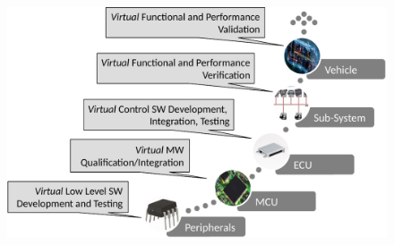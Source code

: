 \documentclass[10pt,journal,compsoc,letterpaper]{IEEEtran}
\begin{document}
\begin{tcolorbox}[float*,title=\sidebar{bar:tech} Technology Background,width=\textwidth]
  \begin{figure}
  \begin{tcolorbox}
  \includegraphics[width=\linewidth]{figures/virtual_platform}
  \end{tcolorbox}
  \end{figure}

\end{tcolorbox}






% 

% 

%
%
\end{document}
